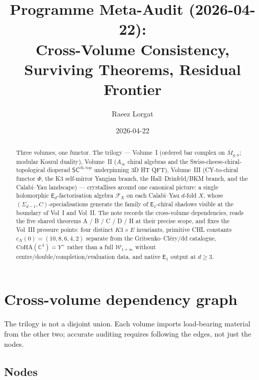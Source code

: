 \documentclass[11pt]{article}
\title{Programme Meta-Audit (2026-04-22):\\
\large Cross-Volume Consistency, Surviving Theorems, Residual Frontier}
\author{Raeez Lorgat}
\date{2026-04-22}
\theoremstyle{definition}
\theoremstyle{remark}
\providecommand{\C}{\mathbb{C}}
\providecommand{\cF}{\mathcal{F}}
\providecommand{\Eone}{\mathsf{E}_1}
\providecommand{\Ed}{\mathsf{E}_d}
\providecommand{\CoHA}{\mathrm{CoHA}}
\providecommand{\Winf}{\mathcal{W}_{1+\infty}}
\providecommand{\Yplus}{Y^{+}}
\begin{document}
\maketitle

\begin{abstract}
Three volumes, one functor. The trilogy --- Volume~I (ordered bar complex on
$\overline{M}_{g,n}$; modular Koszul duality), Volume~II
($A_\infty$ chiral algebras and the Swiss-cheese-chiral-topological
dioperad $\mathsf{SC}^{\mathrm{ch,top}}$ underpinning 3D HT QFT),
Volume~III (CY-to-chiral functor $\Phi$, the K3 self-mirror Yangian
branch, the Hall--Drinfeld/BKM branch, and the Calabi--Yau landscape)
--- crystallises around one canonical picture: a single
holomorphic $\Ed$-factorisation algebra $\cF_X$ on each Calabi--Yau
$d$-fold $X$, whose $(\Sigma_{d-1},C)$-specialisations generate the
family of $\Eone$-chiral shadows visible at the boundary of Vol~I and
Vol~II. The note records the cross-volume dependencies, reads the
five shared theorems A / B / C / D / H at their precise scope, and fixes
the Vol~III pressure points: four distinct $K3\times E$ invariants,
primitive CHL constants $c_N(0)=(10,8,6,4,2)$ separate from the
Gritsenko--Cl\'ery/dd catalogue, $\CoHA(\C^3)=\Yplus$ rather than a full
$\Winf$ without centre/double/completion/evaluation data, and native
$\Eone$ output at $d\geq3$.
\end{abstract}

\tableofcontents

\section{Cross-volume dependency graph}

The trilogy is not a disjoint union. Each volume imports load-bearing
material from the other two; accurate auditing requires following the
edges, not just the nodes.

\subsection{Nodes}
\end{document}
